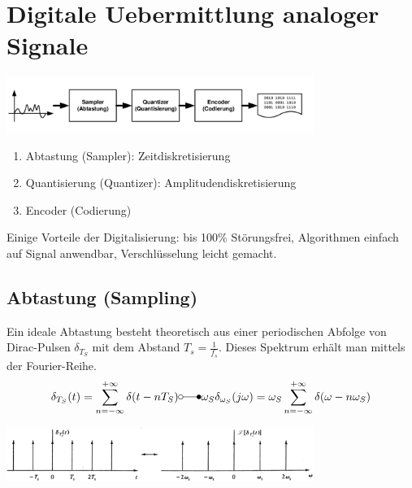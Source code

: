 \newpage
\section{Digitale Uebermittlung analoger Signale}

\begin{center}
	\includegraphics[width=10cm]{bilder/dig_pcm_blockdiagramm.png}
\end{center}
\begin{enumerate}
  \item Abtastung (Sampler): Zeitdiskretisierung 
  \item Quantisierung (Quantizer): Amplitudendiskretisierung
  \item Encoder (Codierung)
\end{enumerate}

Einige Vorteile der Digitalisierung: bis 100\% Störungsfrei, Algorithmen
einfach auf Signal anwendbar, Verschlüsselung leicht gemacht.\\


\subsection{Abtastung (Sampling)}
Ein ideale Abtastung besteht theoretisch aus einer periodischen Abfolge von Dirac-Pulsen
$\delta_{T_S}$ mit dem Abstand $T_s = \frac{1}{f_s}$. Dieses Spektrum erhält man mittels der
Fourier-Reihe. \\ 
$$ \delta_{T_S}(t) = \sum\limits_{n=-\infty}^{+\infty} \delta(t-nT_S) \laplace 
\omega_S \delta_{\omega_S} (j \omega) = 
\omega_S \sum\limits_{n=-\infty}^{+\infty} \delta(\omega - n \omega_S)$$
	\begin{center}
		\includegraphics[width=10cm]{bilder/dig_sampler_ideal.png}
	\end{center}

